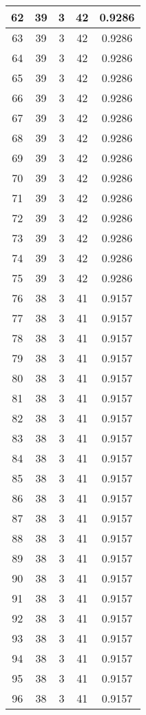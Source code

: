\documentclass[letterpaper, 12pt]{article}
\begin{document}
\begin{longtable}{|c|c|c|c|c|}
\hline
62 & 39 & 3 & 42 & 0.9286 \\
\hline
63 & 39 & 3 & 42 & 0.9286 \\
\hline
64 & 39 & 3 & 42 & 0.9286 \\
\hline
65 & 39 & 3 & 42 & 0.9286 \\
\hline
66 & 39 & 3 & 42 & 0.9286 \\
\hline
67 & 39 & 3 & 42 & 0.9286 \\
\hline
68 & 39 & 3 & 42 & 0.9286 \\
\hline
69 & 39 & 3 & 42 & 0.9286 \\
\hline
70 & 39 & 3 & 42 & 0.9286 \\
\hline
71 & 39 & 3 & 42 & 0.9286 \\
\hline
72 & 39 & 3 & 42 & 0.9286 \\
\hline
73 & 39 & 3 & 42 & 0.9286 \\
\hline
74 & 39 & 3 & 42 & 0.9286 \\
\hline
75 & 39 & 3 & 42 & 0.9286 \\
\hline
76 & 38 & 3 & 41 & 0.9157 \\
\hline
77 & 38 & 3 & 41 & 0.9157 \\
\hline
78 & 38 & 3 & 41 & 0.9157 \\
\hline
79 & 38 & 3 & 41 & 0.9157 \\
\hline
80 & 38 & 3 & 41 & 0.9157 \\
\hline
81 & 38 & 3 & 41 & 0.9157 \\
\hline
82 & 38 & 3 & 41 & 0.9157 \\
\hline
83 & 38 & 3 & 41 & 0.9157 \\
\hline
84 & 38 & 3 & 41 & 0.9157 \\
\hline
85 & 38 & 3 & 41 & 0.9157 \\
\hline
86 & 38 & 3 & 41 & 0.9157 \\
\hline
87 & 38 & 3 & 41 & 0.9157 \\
\hline
88 & 38 & 3 & 41 & 0.9157 \\
\hline
89 & 38 & 3 & 41 & 0.9157 \\
\hline
90 & 38 & 3 & 41 & 0.9157 \\
\hline
91 & 38 & 3 & 41 & 0.9157 \\
\hline
92 & 38 & 3 & 41 & 0.9157 \\
\hline
93 & 38 & 3 & 41 & 0.9157 \\
\hline
94 & 38 & 3 & 41 & 0.9157 \\
\hline
95 & 38 & 3 & 41 & 0.9157 \\
\hline
96 & 38 & 3 & 41 & 0.9157 \\

\end{longtable}
\end{document}
